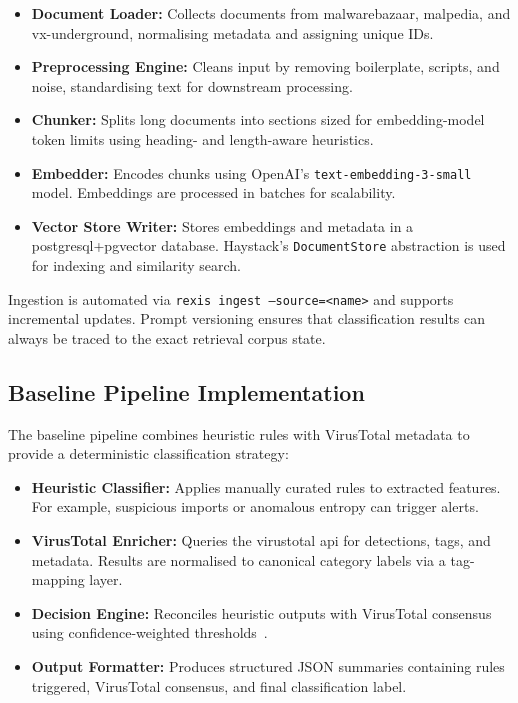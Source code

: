 \begin{itemize}
      \item \textbf{Document Loader:} Collects documents from \gls{malwarebazaar},
            \gls{malpedia}, and \gls{vx-underground}, normalising metadata and assigning unique IDs.

      \item \textbf{Preprocessing Engine:} Cleans input by removing boilerplate,
            scripts, and noise, standardising text for downstream processing.

      \item \textbf{Chunker:} Splits long documents into sections sized for
            embedding-model token limits using heading- and length-aware heuristics.

      \item \textbf{Embedder:} Encodes chunks using OpenAI’s
            \texttt{text-embedding-3-small} model. Embeddings are processed in batches
            for scalability.

      \item \textbf{Vector Store Writer:} Stores embeddings and metadata in a
            \gls{postgresql}+\gls{pgvector} database. Haystack’s \texttt{DocumentStore}
            abstraction is used for indexing and similarity search.
\end{itemize}

Ingestion is automated via \texttt{rexis ingest --source=<name>} and supports incremental updates.
Prompt versioning ensures that classification results can always be traced to the exact retrieval
corpus state.

\subsection{Baseline Pipeline Implementation}\label{subsec:BaselineImplementation}
The baseline pipeline combines heuristic rules with VirusTotal metadata to provide a deterministic
classification strategy:

\begin{itemize}
      \item \textbf{Heuristic Classifier:} Applies manually curated rules to extracted
            features. For example, suspicious imports or anomalous entropy can trigger alerts.

      \item \textbf{VirusTotal Enricher:} Queries the \gls{virustotal} \gls{api} for
            detections, tags, and metadata. Results are normalised to canonical category labels
            via a tag-mapping layer.

      \item \textbf{Decision Engine:} Reconciles heuristic outputs with VirusTotal
            consensus using confidence-weighted thresholds~\cite{rexisReconciliationGuide}.

      \item \textbf{Output Formatter:} Produces structured JSON summaries containing
            rules triggered, VirusTotal consensus, and final classification label.
\end{itemize}

